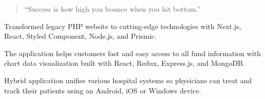 
\begin{quote}
``Success is how high you bounce when you hit bottom.''
\end{quote}



\divider


\divider


\divider






Transformed legacy PHP website to cutting-edge technologies with Next.js, React, Styled Component, Node.js, and Prismic. 

\divider

The application helps customers fast and easy access to all fund information with chart data visualization built with React, Redux, Express.js, and MongoDB.

\divider

Hybrid application unifies various hospital systems so physicians can treat and track their patients using an Android, iOS or Windows device.
